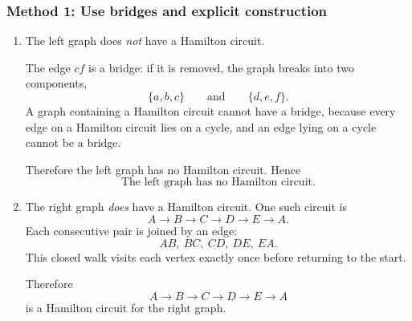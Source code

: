 \documentclass[12pt]{article}
\begin{document}
\subsubsection{Method 1: Use bridges and explicit construction}
\begin{enumerate}[label=(\alph*)]
\item The left graph does \emph{not} have a Hamilton circuit.

The edge \(cf\) is a bridge: if it is removed, the graph breaks into two components,
\[
\{a,b,c\}
\qquad\text{and}\qquad
\{d,e,f\}.
\]
A graph containing a Hamilton circuit cannot have a bridge, because every edge on a Hamilton circuit lies on a cycle, and an edge lying on a cycle cannot be a bridge.

Therefore the left graph has no Hamilton circuit. Hence
\[
\boxed{\text{The left graph has no Hamilton circuit.}}
\]

\item The right graph \emph{does} have a Hamilton circuit. One such circuit is
\[
A\to B\to C\to D\to E\to A.
\]
Each consecutive pair is joined by an edge:
\[
AB,\ BC,\ CD,\ DE,\ EA.
\]
This closed walk visits each vertex exactly once before returning to the start.

Therefore
\[
\boxed{A\to B\to C\to D\to E\to A}
\]
is a Hamilton circuit for the right graph.
\end{enumerate}
\end{document}

